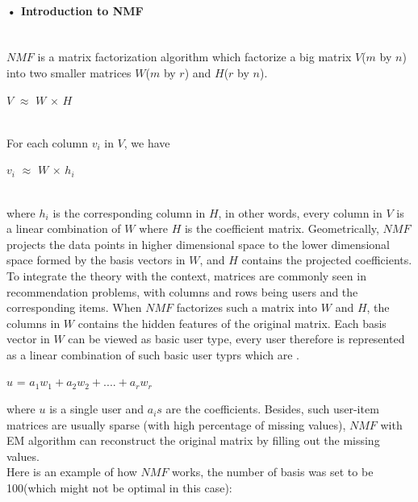 \documentclass[11pt]{article} %
\begin{document}
\paragraph{• Introduction to NMF}\mbox{}\\
$NMF$ is a matrix factorization algorithm which factorize a big matrix $V$($m$ by $n$) into two smaller matrices $W$($m$ by $r$) and $H$($r$ by $n$). \\
\centerline{$V$ $\approx$ $W$ $\times$ $H$}\\
For each column $v_{i}$ in $V$, we have\\
\centerline{$v_{i}$ $\approx$ $W$ $\times$ $h_{i}$}\\
where $h_{i}$ is the corresponding column in $H$, in other words, every column in $V$ is a linear combination of $W$ where $H$ is the coefficient matrix. Geometrically, $NMF$ projects the data points in higher dimensional space to the lower dimensional space formed by the basis vectors in $W$, and $H$ contains the projected coefficients.\\
To integrate the theory with the context, matrices are commonly seen in recommendation problems, with columns and rows being users and the corresponding items. When $NMF$ factorizes such a matrix into $W$ and $H$, the columns in $W$ contains the hidden features of the original matrix. Each basis vector in $W$ can be viewed as basic user type, every user therefore is represented as a linear combination of such basic user typrs which are .\\
\centerline{$u$ = $a_1w_1+a_2w_2+....+a_rw_r$}
where $u$ is a single user and $a_is$ are the coefficients.
Besides, such user-item matrices are usually sparse (with high percentage of missing values), $NMF$ with EM algorithm can reconstruct the original matrix by filling out the missing values.\\
Here is an example of how $NMF$ works, the number of basis was set to be 100(which might not be optimal in this case):
\end{document}
